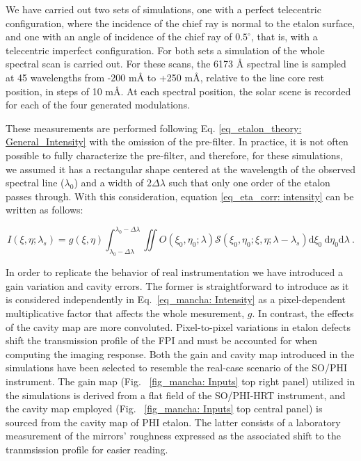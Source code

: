 We have carried out two sets of simulations, one with a perfect telecentric configuration, where the incidence of the chief ray is normal to the etalon surface, and one with an angle of incidence of the chief ray of $0.5^\circ$, that is, with a telecentric imperfect configuration. For both sets a simulation of the whole spectral scan is carried out. For these scans, the 6173 \r{A} spectral line is sampled at 45 wavelengths from -200 m\r{A} to +250 m\r{A}, relative to the line core rest position, in steps of 10 m\r{A}. At each spectral position, the solar scene is recorded for each of the four generated modulations.

These measurements are performed following Eq. \eqref{eq_etalon_theory: General_Intensity} with the omission of the pre-filter. In practice, it is not often possible to fully characterize the pre-filter, and therefore, for these simulations, we assumed it has a rectangular shape centered at the wavelength of the observed spectral line ($\lambda _ {0}$) and a width of $2\Delta \lambda$ such that only one order of the etalon passes through. With this consideration, equation \eqref{eq_eta_corr: intensity} can be written as follows:

\begin{equation}
  I\left(\xi, \eta ; \lambda_{s}\right)=g(\xi, \eta)\int_{\lambda _ 0 - \Delta \lambda}^{\lambda _ 0 - \Delta \lambda} \iint  O\left(\xi_0, \eta_0 ; \lambda\right)  \mathcal{S}\left(\xi_0, \eta_0; \xi , \eta; \lambda-\lambda_{s}\right)  \mathrm{d} \xi_{0} \mathrm{~d} \eta_{0}\mathrm{d} \lambda \ .
  \label{eq_mancha: Intensity}
\end{equation}

In order to replicate the behavior of real instrumentation we have introduced a gain variation and cavity errors. The former is straightforward to introduce as it is considered independently in Eq.~\eqref{eq_mancha: Intensity} as a pixel-dependent multiplicative factor that affects the whole mesurement, $g$. In contrast, the effects of the cavity map are more convoluted. Pixel-to-pixel variations in etalon defects shift the transmission profile of the FPI and must be accounted for when computing the imaging response. Both the gain and cavity map introduced in the simulations have been selected to resemble the real-case scenario of the SO/PHI instrument. The gain map (Fig. ~\ref{fig_mancha: Inputs} top right panel) utilized in the simulations is derived from a flat field of the SO/PHI-HRT instrument, and the cavity map employed (Fig. ~\ref{fig_mancha: Inputs} top central panel) is sourced from the cavity map of PHI etalon. The latter consists of a laboratory measurement of the mirrors' roughness expressed as the associated shift to the tranmsission profile for easier reading.

